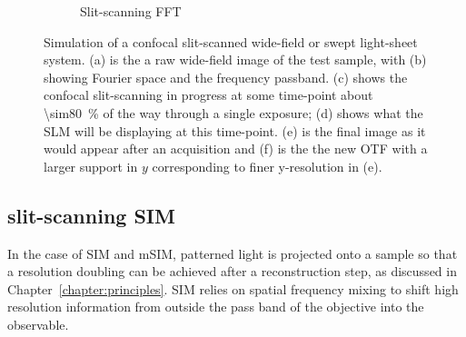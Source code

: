 \begin{figure}[ht]
\begin{subfigure}[t]{0.3\textwidth}
      \caption{Slit-scanning \gls{FFT}}
  \end{subfigure}
  \caption[Simulation of a confocal slit-scanned wide-field or swept light-sheet system]{
  Simulation of a confocal slit-scanned wide-field or swept light-sheet system.
  (a) is the a raw wide-field image of the test sample, with (b) showing Fourier space and the frequency passband.
  (c) shows the confocal \gls{slit-scanning} in progress at some time-point about \SI{\sim80}{\percent} of the way through a single exposure;
  (d) shows what the \gls{SLM} will be displaying at this time-point.
  (e) is the final image as it would appear after an acquisition and (f) is the the new \gls{OTF} with a larger support in \(y\) corresponding to finer y-resolution in (e).
  }\label{fig:widefield_slit}
\end{figure}

\subsection{\Gls{slit-scanning} \gls{SIM}}

In the case of \gls{SIM} and \gls{mSIM}, patterned light is projected onto a sample so that a resolution doubling can be achieved after a reconstruction step, as discussed in Chapter~\ref{chapter:principles}.
\gls{SIM} relies on spatial frequency mixing to shift high resolution information from outside the pass band of the objective into the observable.

